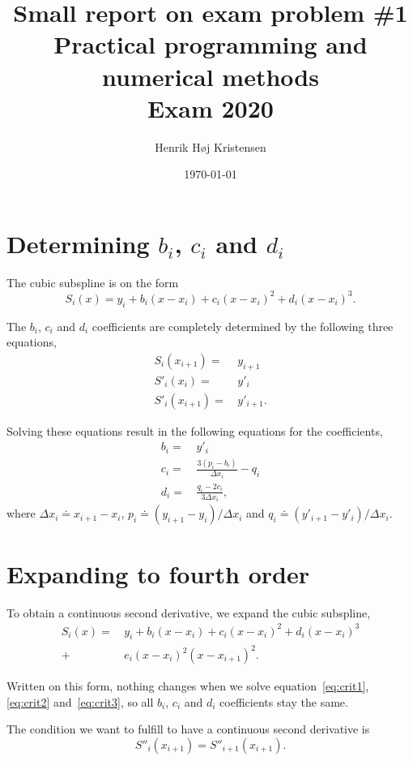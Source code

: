 \documentclass[twocolumn]{article}
\title{Small report on exam problem \#1 \\
\normalsize Practical programming and numerical methods \\
Exam 2020}
\author{Henrik H\o j Kristensen}
\date{\today}
\begin{document}
\maketitle

\section{Determining $b_i$, $c_i$ and $d_i$}

The cubic subspline is on the form
\begin{equation}
S_i(x) = y_i + b_i(x-x_i) + c_i(x-x_i)^2 + d_i(x-x_i)^3.
\end{equation}

The $b_i$, $c_i$ and $d_i$ coefficients are completely determined by the following three equations,
\begin{align}
S_i(x_{i+1}) =&\, y_{i+1} \label{eq:crit1} \\
S'_i(x_i) =&\, y'_i \label{eq:crit2} \\
S'_i(x_{i+1}) =&\, y'_{i+1} \label{eq:crit3}.
\end{align}

Solving these equations result in the following equations for the coefficients,
\begin{align}
b_i =&\, y'_i \\
c_i =&\, \frac{3(p_i-b_i)}{\Delta x_i} - q_i \\
d_i =&\, \frac{q_i - 2c_i}{3\Delta x_i},
\end{align}
where $\Delta x_i \doteq x_{i+1} - x_i$, $p_i \doteq (y_{i+1}-y_i)/\Delta x_i$ and $q_i \doteq (y'_{i+1}-y'_i)/\Delta x_i$.

\section{Expanding to fourth order}

To obtain a continuous second derivative, we expand the cubic subspline,
\begin{align}
S_i(x) =&\, y_i + b_i(x-x_i) + c_i(x-x_i)^2 + d_i(x-x_i)^3 \\
	+&\, e_i(x-x_i)^2(x-x_{i+1})^2.
\end{align}

Written on this form, nothing changes when we solve equation~\ref{eq:crit1}, \ref{eq:crit2} and~\ref{eq:crit3}, so all $b_i$, $c_i$ and $d_i$ coefficients stay the same.

The condition we want to fulfill to have a continuous second derivative is
\begin{equation}
S''_i(x_{i+1}) = S''_{i+1}(x_{i+1}).
\end{equation}
\end{document}
